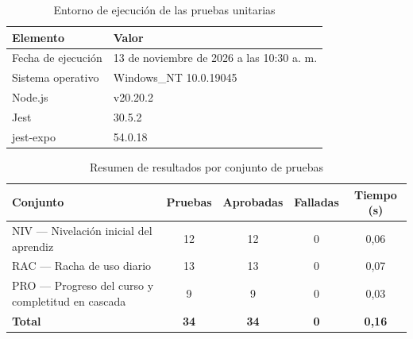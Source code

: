 \begin{table}[H]
\centering
\caption{Entorno de ejecución de las pruebas unitarias}
\label{tab:pruebas-entorno}
\begin{tabular}{ll}
\hline
\textbf{Elemento} & \textbf{Valor} \\ \hline
Fecha de ejecución & 13 de noviembre de 2026 a las 10:30 a. m. \\
Sistema operativo & Windows\_NT 10.0.19045 \\
Node.js & v20.20.2 \\
Jest & 30.5.2 \\
jest-expo & 54.0.18 \\ \hline
\end{tabular}
\end{table}

\begin{table}[H]
\centering
\caption{Resumen de resultados por conjunto de pruebas}
\label{tab:pruebas-resumen}
\begin{tabular}{>{\raggedright\arraybackslash}p{}cccc}
\hline
\textbf{Conjunto} & \textbf{Pruebas} & \textbf{Aprobadas} & \textbf{Falladas} & \textbf{Tiempo (s)} \\ \hline
NIV --- Nivelación inicial del aprendiz & 12 & 12 & 0 & 0,06 \\
RAC --- Racha de uso diario & 13 & 13 & 0 & 0,07 \\
PRO --- Progreso del curso y completitud en cascada & 9 & 9 & 0 & 0,03 \\
\hline
\textbf{Total} & \textbf{34} & \textbf{34} & \textbf{0} & \textbf{0,16} \\ \hline
\end{tabular}
\end{table}

